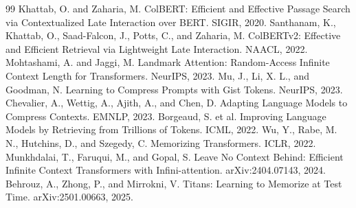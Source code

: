 \documentclass[11pt]{article}
\begin{document}
\begin{thebibliography}{99}
 Khattab, O. and Zaharia, M. ColBERT: Efficient and Effective Passage Search via Contextualized Late Interaction over BERT. SIGIR, 2020.
 Santhanam, K., Khattab, O., Saad-Falcon, J., Potts, C., and Zaharia, M. ColBERTv2: Effective and Efficient Retrieval via Lightweight Late Interaction. NAACL, 2022.
 Mohtashami, A. and Jaggi, M. Landmark Attention: Random-Access Infinite Context Length for Transformers. NeurIPS, 2023.
 Mu, J., Li, X. L., and Goodman, N. Learning to Compress Prompts with Gist Tokens. NeurIPS, 2023.
 Chevalier, A., Wettig, A., Ajith, A., and Chen, D. Adapting Language Models to Compress Contexts. EMNLP, 2023.
 Borgeaud, S. et al. Improving Language Models by Retrieving from Trillions of Tokens. ICML, 2022.
 Wu, Y., Rabe, M. N., Hutchins, D., and Szegedy, C. Memorizing Transformers. ICLR, 2022.
 Munkhdalai, T., Faruqui, M., and Gopal, S. Leave No Context Behind: Efficient Infinite Context Transformers with Infini-attention. arXiv:2404.07143, 2024.
 Behrouz, A., Zhong, P., and Mirrokni, V. Titans: Learning to Memorize at Test Time. arXiv:2501.00663, 2025.
\end{thebibliography}
\end{document}
